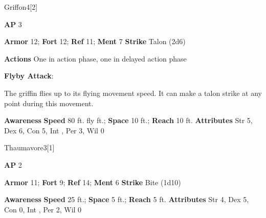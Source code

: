 \begin{monsection}{Griffon}{4}[2]
\vspace{-1em}\vspace{-1em}
\begin{spellcontent}
\begin{spelltargetinginfo}
{\textbf{AP} 3}

\pari \textbf{Armor} 12;
\textbf{Fort} 12;
\textbf{Ref} 11;
\textbf{Ment} 7
\pari \textbf{Strike} Talon  (2d6)


\pari \textbf{Actions} One in action phase, one in delayed action phase
\end{spelltargetinginfo}


\begin{spelleffects}

\pari
\textbf{Flyby Attack}:

The griffin flies up to its flying movement speed.
It can make a talon strike at any point during this movement.




\end{spelleffects}

\end{spellcontent}

\begin{monsterfooter}
\pari \textbf{Awareness} 
\pari \textbf{Speed} 80 ft. fly ft.;
\textbf{Space} 10 ft.;
\textbf{Reach} 10 ft.
\pari \textbf{Attributes}
Str 5,
Dex 6,
Con 5,
Int ,
Per 3,
Wil 0
\end{monsterfooter}
\end{monsection}



\begin{monsection}{Thaumavore}{3}[1]
\vspace{-1em}\vspace{-1em}
\begin{spellcontent}
\begin{spelltargetinginfo}
{\textbf{AP} 2}

\pari \textbf{Armor} 11;
\textbf{Fort} 9;
\textbf{Ref} 14;
\textbf{Ment} 6
\pari \textbf{Strike} Bite  (1d10)



\end{spelltargetinginfo}


\end{spellcontent}

\begin{monsterfooter}
\pari \textbf{Awareness} 
\pari \textbf{Speed} 25 ft.;
\textbf{Space} 5 ft.;
\textbf{Reach} 5 ft.
\pari \textbf{Attributes}
Str 4,
Dex 5,
Con 0,
Int ,
Per 2,
Wil 0
\end{monsterfooter}
\end{monsection}



